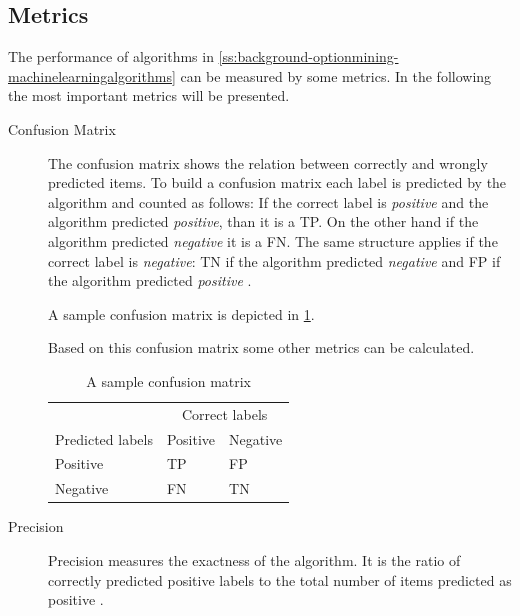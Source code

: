 \subsection{Metrics}
\label{ss:background-optionmining-metrics}

The performance of algorithms in \cref{ss:background-optionmining-machinelearningalgorithms} can be measured by some metrics.
In the following the most important metrics will be presented.

\begin{description}
	\item [Confusion Matrix]
		The confusion matrix shows the relation between correctly and wrongly predicted items.
		To build a confusion matrix each label is predicted by the algorithm and counted as follows:
		If the correct label is \emph{positive} and the algorithm predicted \emph{positive}, than it is a \ac{TP}.
		On the other hand if the algorithm predicted \emph{negative} it is a \ac{FN}.
		The same structure applies if the correct label is \emph{negative}: \ac{TN} if the algorithm predicted \emph{negative} and \ac{FP} if the algorithm predicted \emph{positive}
		\cite{Tripathy2015}.

		A sample confusion matrix is depicted in \cref{tab:background-optionmining-confusionmatrix}.

		Based on this confusion matrix some other metrics can be calculated.
		
		\begin{table}
			\begin{center}
				\begin{tabular}{l | l l}
					 & \multicolumn{2}{c}{Correct labels} \\
					Predicted labels & Positive & Negative \\ \hline
					Positive & \ac{TP} & \ac{FP} \\
					Negative & \ac{FN} & \ac{TN} \\ \hline					
				\end{tabular}
		
				\caption{A sample confusion matrix}
				\label{tab:background-optionmining-confusionmatrix}
			\end{center}
		\end{table}

	\item [Precision]
		Precision measures the exactness of the algorithm.
		It is the ratio of correctly predicted positive labels to the total number of items predicted as positive
		\cite{Tripathy2015}.


\end{description}
